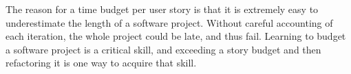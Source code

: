 \begin{itemize}
The reason for a time budget per user story is that it is extremely easy to underestimate the length of a software project. Without careful accounting of each iteration, the whole project could be late, and thus fail. Learning to budget a software project is a critical skill, and exceeding a story budget and then refactoring it is one way to acquire that skill.
\end{itemize}
